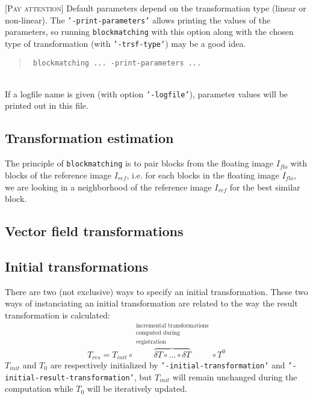 \documentclass[10pt]{report}
\def\blockmatching{\texttt{blockmatching} }
\newenvironment{attention}{\noindent \textsc{[Pay attention]}}{}
\newcommand{\option}[1]{{\texttt{'#1'}}}
\newenvironment{code}[1]{\mbox{}\\[1ex]\hspace*{-#1cm}\begin{minipage}{150mm}\begin{quote}\tt}{\end{quote}\end{minipage}\mbox{}\\[1ex]}
\begin{document}
\begin{attention} 
Default parameters depend on the transformation type (linear or non-linear). 
The \option{-print-parameters} allows printing the values of the parameters, so running \blockmatching with this option along with the chosen type of transformation (with \option{-trsf-type}) may be a good idea. 
\begin{code}{1}
\% \blockmatching ... -print-parameters ...
\end{code}
If a logfile name is given (with option \option{-logfile}), parameter values will be printed out in this file.
\end{attention}


\subsection{Transformation estimation}

The principle of \blockmatching is to pair blocks from the floating
image $I_{flo}$ with blocks of the  reference image $I_{ref}$,
i.e. for each blocks in  the floating
image $I_{flo}$, we are looking in a neighborhood of the reference
image $I_{ref}$ for the best similar block.


\subsection{Vector field transformations}



\subsection{Initial transformations}
There are two (not exclusive) ways to specify an initial transformation.
These two ways of instanciating an initial transformation are related to the way the result transformation is calculated:
\begin{equation}
T_{res}= T_{init}
\circ 
\overbrace{\delta{T} \circ \ldots \circ \delta{T}}^{\begin{array}{c}\textrm{incremental transformations} \\ \textrm{computed during} \\ r\textrm{egistration}\end{array}} 
\circ 
T^0
\label{eq:tresversustinit}
\end{equation}
$T_{init}$ and $T_0$ are respectively initialized by \option{-initial-transformation} 
and \option{-initial-result-transformation}, but $T_{init}$ will remain unchanged during the computation
while $T_0$ will be iteratively updated.
\end{document}
